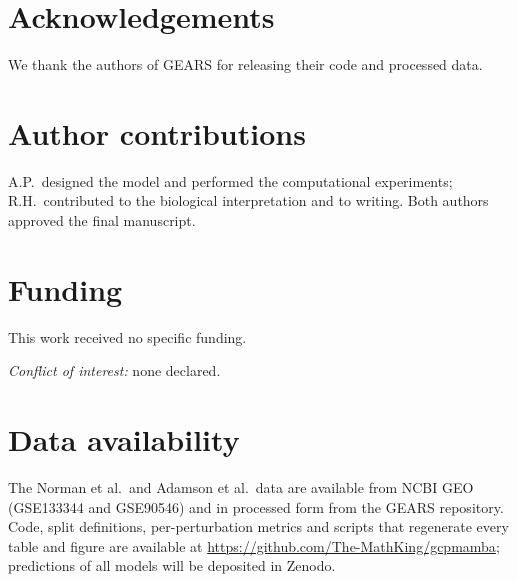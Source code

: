 \documentclass{bioinfo}
\begin{document}
\section*{Acknowledgements}
We thank the authors of GEARS for releasing their code and processed data.

\section*{Author contributions}
A.P.\ designed the model and performed the computational experiments; R.H.\ contributed to the
biological interpretation and to writing. Both authors approved the final manuscript.

\section*{Funding}
This work received no specific funding.

\medskip
\noindent\textit{Conflict of interest:} none declared.

\section*{Data availability}
The Norman et al.\ and Adamson et al.\ data are available from NCBI GEO (GSE133344 and GSE90546) and
in processed form from the GEARS repository. Code, split definitions, per-perturbation metrics and
scripts that regenerate every table and figure are available at
\url{https://github.com/The-MathKing/gcpmamba}; predictions of all models will be deposited in Zenodo.



\end{document}
